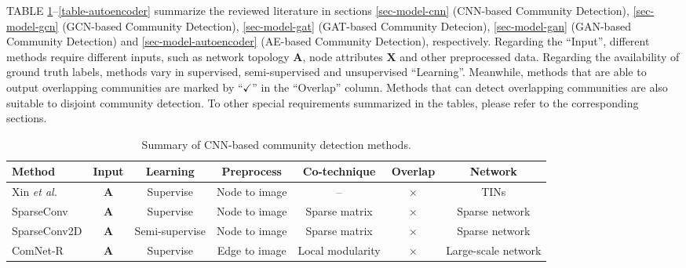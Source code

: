 \label{sec-stdlcd}
TABLE \ref{table-cnn}--\ref{table-autoencoder} summarize the reviewed literature in sections \ref{sec-model-cnn} (CNN-based Community Detection), \ref{sec-model-gcn} (GCN-based Community Detection), \ref{sec-model-gat} (GAT-based Community Detecion), \ref{sec-model-gan} (GAN-based Community Detection) and \ref{sec-model-autoencoder} (AE-based Community Detection), respectively. Regarding the ``Input'', different methods require different inputs, such as network topology $\bm{A}$, node attributes $\bm{X}$ and other preprocessed data. Regarding the availability of ground truth labels, methods vary in supervised, semi-supervised and unsupervised ``Learning''. Meanwhile, methods that are able to output overlapping communities are marked by ``$\checkmark$'' in the ``Overlap'' column. Methods that can detect overlapping communities are also suitable to disjoint community detection. To other special requirements summarized in the tables, please refer to the corresponding sections.
\begin{table}[h]
\centering 
\footnotesize
\renewcommand\arraystretch{1.1}
\setlength{\tabcolsep}{4.5mm}
\caption{Summary of CNN-based community detection methods.}
\begin{tabular}{lcccccc}
\toprule[1 pt]
\textbf{Method} & \textbf{Input} & \textbf{Learning} &  \textbf{Preprocess} & \textbf{Co-technique} & \textbf{Overlap} & \textbf{Network} \\ 
\midrule
Xin \textit{et al.}  & $\bm{A}$ & Supervise & Node to image & -- & $\times$ & TINs \\ 
SparseConv  & $\bm{A}$ & Supervise & Node to image & Sparse matrix & $\times$ & Sparse network \\
SparseConv2D  & $\bm{A}$ & Semi-supervise & Node to image & Sparse matrix & $\times$ & Sparse network \\ 
ComNet-R  & $\bm{A}$ & Supervise & Edge to image & Local modularity & $\times$ & Large-scale network \\
\bottomrule[1 pt]
\end{tabular}
\label{table-cnn}
\end{table}
